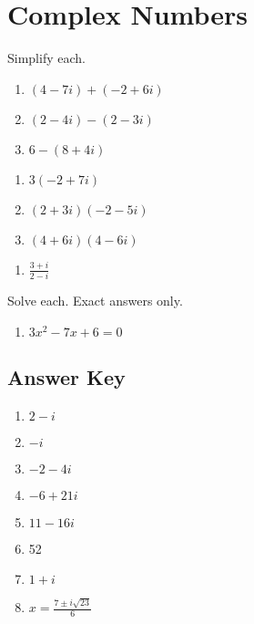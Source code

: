 \chapter{Complex Numbers}

Simplify each.

\begin{multicols}{3}
\begin{enumerate}
	\item $(4-7i)+(-2+6i)$
	\item $(2-4i)-(2-3i)$
	\item $6 - (8 + 4i)$
\end{enumerate}	\setcounter{Review}{\value{enumi}}
\end{multicols}

\begin{multicols}{3}
\begin{enumerate}		\setcounter{enumi}{\value{Review}}
	\item $3(-2 + 7i)$
	\item $(2+3i)(-2-5i)$
	\item $(4+6i)(4-6i)$
\end{enumerate}	\setcounter{Review}{\value{enumi}}
\end{multicols}

\begin{multicols}{3}
\begin{enumerate}		\setcounter{enumi}{\value{Review}}
	\item $\frac{3+i}{2-i}$
\end{enumerate}	\setcounter{Review}{\value{enumi}}
\end{multicols}

Solve each. Exact answers only.
\begin{multicols}{3}
\begin{enumerate}		\setcounter{enumi}{\value{Review}}
	\item $3x^2-7x+6=0$
\end{enumerate}	\setcounter{Review}{\value{enumi}}
\end{multicols}

\newpage

\section*{Answer Key}

\begin{enumerate}
	\item $2-i$
    \item $-i$
    \item $-2-4i$
    \item $-6+21i$
    \item $11-16i$
    \item 52
    \item $1 + i$
    
    \item $x = \frac{7 \pm i\sqrt{23}}{6}$
\end{enumerate}